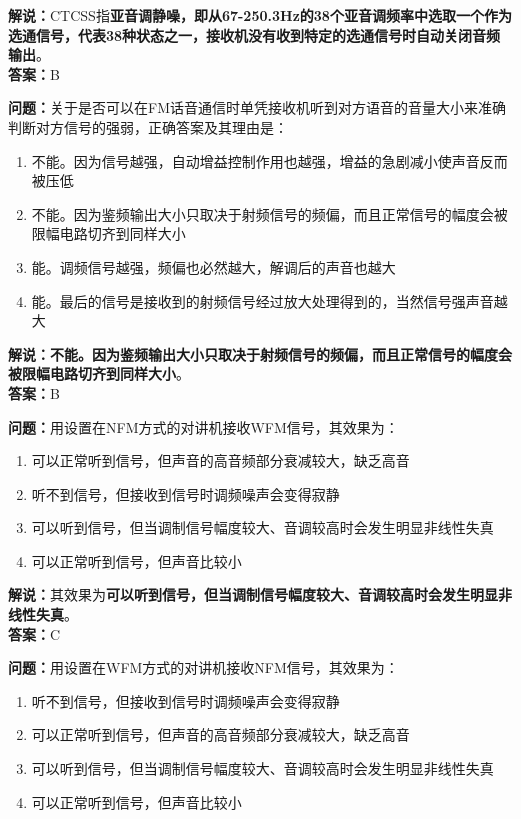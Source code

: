 \textbf{解说：}CTCSS指\textbf{亚音调静噪，即从67-250.3Hz的38个亚音调频率中选取一个作为选通信号，代表38种状态之一，接收机没有收到特定的选通信号时自动关闭音频输出}。\\\textbf{答案：}B



\textbf{问题：}关于是否可以在FM话音通信时单凭接收机听到对方语音的音量大小来准确判断对方信号的强弱，正确答案及其理由是：

\begin{enumerate}[label=\Alph*), leftmargin=1.5cm]
	\item 不能。因为信号越强，自动增益控制作用也越强，增益的急剧减小使声音反而被压低
	\item 不能。因为鉴频输出大小只取决于射频信号的频偏，而且正常信号的幅度会被限幅电路切齐到同样大小
	\item 能。调频信号越强，频偏也必然越大，解调后的声音也越大
	\item 能。最后的信号是接收到的射频信号经过放大处理得到的，当然信号强声音越大
\end{enumerate}

\textbf{解说：不能。因为鉴频输出大小只取决于射频信号的频偏，而且正常信号的幅度会被限幅电路切齐到同样大小}。\\\textbf{答案：}B



\textbf{问题：}用设置在NFM方式的对讲机接收WFM信号，其效果为：

\begin{enumerate}[label=\Alph*), leftmargin=1.5cm]
	\item 可以正常听到信号，但声音的高音频部分衰减较大，缺乏高音
	\item 听不到信号，但接收到信号时调频噪声会变得寂静
	\item 可以听到信号，但当调制信号幅度较大、音调较高时会发生明显非线性失真
	\item 可以正常听到信号，但声音比较小
\end{enumerate}

\textbf{解说：}其效果为\textbf{可以听到信号，但当调制信号幅度较大、音调较高时会发生明显非线性失真}。\\\textbf{答案：}C



\textbf{问题：}用设置在WFM方式的对讲机接收NFM信号，其效果为：

\begin{enumerate}[label=\Alph*), leftmargin=1.5cm]
	\item 听不到信号，但接收到信号时调频噪声会变得寂静
	\item 可以正常听到信号，但声音的高音频部分衰减较大，缺乏高音
	\item 可以听到信号，但当调制信号幅度较大、音调较高时会发生明显非线性失真
	\item 可以正常听到信号，但声音比较小
\end{enumerate}

